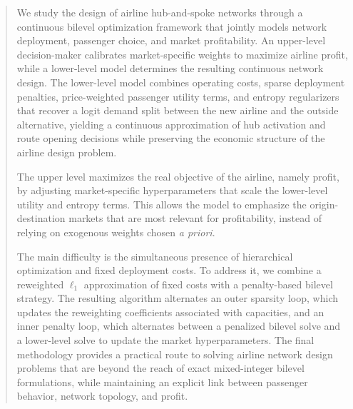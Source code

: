 \begin{abstract}
We study the design of airline hub-and-spoke networks through a continuous bilevel optimization framework that jointly models network deployment, passenger choice, and market profitability. An upper-level decision-maker calibrates market-specific weights to maximize airline profit, while a lower-level model determines the resulting continuous network design. The lower-level model combines operating costs, sparse deployment penalties, price-weighted passenger utility terms, and entropy regularizers that recover a logit demand split between the new airline and the outside alternative, yielding a continuous approximation of hub activation and route opening decisions while preserving the economic structure of the airline design problem.

The upper level maximizes the real objective of the airline, namely profit, by adjusting market-specific hyperparameters that scale the lower-level utility and entropy terms. This allows the model to emphasize the origin-destination markets that are most relevant for profitability, instead of relying on exogenous weights chosen \emph{a priori}.

The main difficulty is the simultaneous presence of hierarchical optimization and fixed deployment costs. To address it, we combine a reweighted $\ell_1$ approximation of fixed costs with a penalty-based bilevel strategy. The resulting algorithm alternates an outer sparsity loop, which updates the reweighting coefficients associated with capacities, and an inner penalty loop, which alternates between a penalized bilevel solve and a lower-level solve to update the market hyperparameters. The final methodology provides a practical route to solving airline network design problems that are beyond the reach of exact mixed-integer bilevel formulations, while maintaining an explicit link between passenger behavior, network topology, and profit.
\end{abstract}
